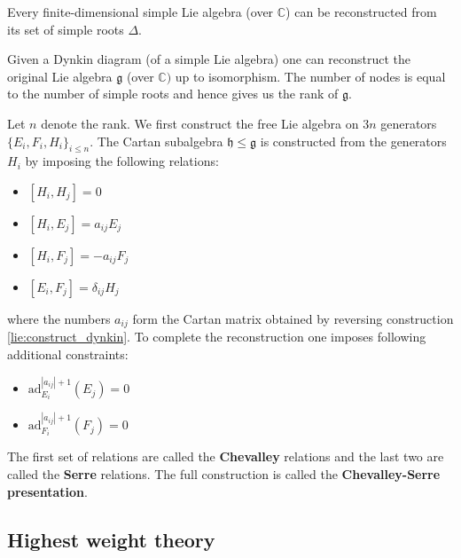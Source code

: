     \begin{theorem}
        Every finite-dimensional simple Lie algebra (over $\mathbb{C}$) can be reconstructed from its set of simple roots $\Delta$.
    \end{theorem}
    \begin{construct}\label{lie:reconstruction}
        Given a Dynkin diagram (of a simple Lie algebra) one can reconstruct the original Lie algebra $\mathfrak{g}$ (over $\mathbb{C})$ up to isomorphism. The number of nodes is equal to the number of simple roots and hence gives us the rank of $\mathfrak{g}$.

        Let $n$ denote the rank. We first construct the free Lie algebra on $3n$ generators $\{E_i, F_i, H_i\}_{i\leq n}$. The Cartan subalgebra $\mathfrak{h}\leq\mathfrak{g}$ is constructed from the generators $H_i$ by imposing the following relations:
        \begin{itemize}
            \item $[H_i, H_j] = 0$
            \item $[H_i, E_j] = a_{ij}E_j$
            \item $[H_i, F_j] = -a_{ij}F_j$
            \item $[E_i, F_j] = \delta_{ij}H_j$
        \end{itemize}
        where the numbers $a_{ij}$ form the Cartan matrix obtained by reversing construction \ref{lie:construct_dynkin}. To complete the reconstruction one imposes following additional constraints:
        \begin{itemize}
            \item $\text{ad}_{E_i}^{|a_{ij}|+1}(E_j) = 0$
            \item $\text{ad}_{F_i}^{|a_{ij}|+1}(F_j) = 0$
        \end{itemize}
        The first set of relations are called the \textbf{Chevalley} relations and the last two are called the \textbf{Serre} relations. The full construction is called the \textbf{Chevalley-Serre presentation}.
    \end{construct}

\subsection{Highest weight theory}

